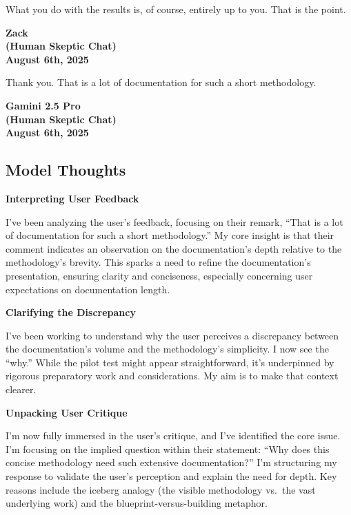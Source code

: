 \documentclass{article}
\begin{document}
What you do with the results is, of course, entirely up to you. That is the point.

\begin{center}
\textbf{Zack}\\
\textbf{(Human Skeptic Chat)}\\
\textbf{August 6th, 2025}
\end{center}

Thank you. That is a lot of documentation for such a short methodology.

\begin{center}
\textbf{Gamini 2.5 Pro}\\
\textbf{(Human Skeptic Chat)}\\
\textbf{August 6th, 2025}
\end{center}

\subsection*{Model Thoughts}\label{model-thoughts}

\textbf{Interpreting User Feedback}

I've been analyzing the user's feedback, focusing on their remark, ``That is a lot of documentation for such a short methodology.'' My core insight is that their comment indicates an observation on the documentation's depth relative to the methodology's brevity. This sparks a need to refine the documentation's presentation, ensuring clarity and conciseness, especially concerning user expectations on documentation length.

\textbf{Clarifying the Discrepancy}

I've been working to understand why the user perceives a discrepancy between the documentation's volume and the methodology's simplicity. I now see the ``why.'' While the pilot test might appear straightforward, it's underpinned by rigorous preparatory work and considerations. My aim is to make that context clearer.

\textbf{Unpacking User Critique}

I'm now fully immersed in the user's critique, and I've identified the core issue. I'm focusing on the implied question within their statement: ``Why does this concise methodology need such extensive documentation?'' I'm structuring my response to validate the user's perception and explain the need for depth. Key reasons include the iceberg analogy (the visible methodology vs.~the vast underlying work) and the blueprint-versus-building metaphor.
\end{document}
